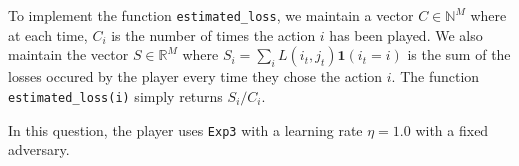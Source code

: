  To implement the function \texttt{estimated\_loss}, we maintain a vector $C \in \mathbb{N}^M$ where at each time, $C_i$ is the number of times the action $i$ has been played. We also maintain the vector $S \in \mathbb{R}^M$ where $S_i = \sum_i L(i_t, j_t) \mathbf{1}(i_t = i)$ is the sum of the losses occured by the player every time they chose the action $i$.
The function \texttt{estimated\_loss(i)} simply returns $S_i / C_i$.


 In this question, the player uses \texttt{Exp3} with a learning rate $\eta = 1.0$ with a fixed adversary.